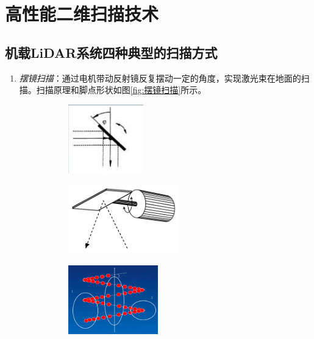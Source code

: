 \section{高性能二维扫描技术} %
\subsection{机载LiDAR系统四种典型的扫描方式} %
\begin{enumerate}
	\item \textit{摆镜扫描}：通过电机带动反射镜反复摆动一定的角度，实现激光束在地面的扫描。扫描原理和脚点形状如图\ref{fig:摆镜扫描}所示。
		\begin{figure}[htbp]
			\centering
			\begin{subfigure}[t]{0.3\linewidth}
				\centering
				\includegraphics[height=3cm]{figure/Chapter3/摆镜扫描1}
			\end{subfigure}
			\begin{subfigure}[t]{0.3\linewidth}
				\centering
				\includegraphics[height=3cm]{figure/Chapter3/摆镜扫描2}
			\end{subfigure}
			\begin{subfigure}[t]{0.3\linewidth}
				\centering
				\includegraphics[height=3cm]{figure/Chapter3/摆镜扫描_脚点}
			\end{subfigure}

\end{figure}
\end{enumerate}
